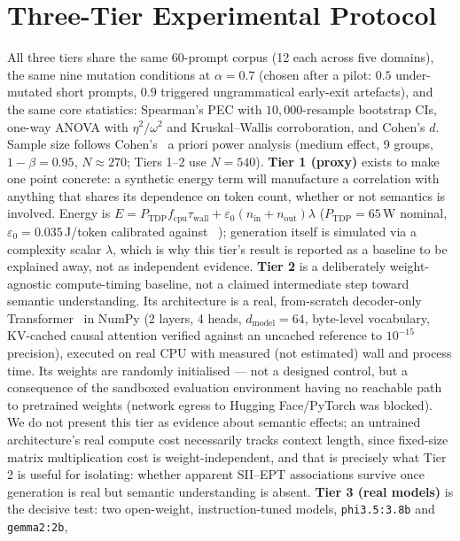 \documentclass[conference]{IEEEtran}
\begin{document}
\section{Three-Tier Experimental Protocol}
\label{sec:protocol}
All three tiers share the same 60-prompt corpus (12 each across five
domains), the same nine mutation conditions at $\alpha=0.7$ (chosen
after a pilot: $0.5$ under-mutated short prompts, $0.9$ triggered
ungrammatical early-exit artefacts), and the same core statistics:
Spearman's PEC with $10{,}000$-resample bootstrap CIs, one-way ANOVA
with $\eta^2/\omega^2$ and Kruskal--Wallis corroboration, and Cohen's
$d$. Sample size follows Cohen's~\cite{cohen1988statistical} a priori
power analysis (medium effect, 9 groups, $1-\beta=0.95$,
$N\approx270$; Tiers 1--2 use $N=540$).
\textbf{Tier 1 (proxy)} exists to make one point concrete: a synthetic
energy term will manufacture a correlation with anything that shares
its dependence on token count, whether or not semantics is involved.
Energy is $E=P_\text{TDP}f_\text{cpu}\tau_\text{wall}+
\varepsilon_0(n_\text{in}+n_\text{out})\lambda$ ($P_\text{TDP}=65$\,W
nominal, $\varepsilon_0=0.035$\,J/token calibrated against
~\cite{samsi2023words,faiz2024llmcarbon}); generation itself is
simulated via a complexity scalar $\lambda$, which is why this tier's
result is reported as a baseline to be explained away, not as
independent evidence.
\textbf{Tier 2} is a deliberately weight-agnostic compute-timing
baseline, not a claimed intermediate step toward semantic
understanding. Its architecture is a real, from-scratch decoder-only
Transformer~\cite{vaswani2017attention} in NumPy (2 layers, 4 heads, $d_\text{model}=64$,
byte-level vocabulary, KV-cached causal attention verified against an
uncached reference to $10^{-15}$ precision), executed on real CPU with
measured (not estimated) wall and process time. Its weights are
randomly initialised --- not a designed control, but a consequence of
the sandboxed evaluation environment having no reachable path to
pretrained weights (network egress to Hugging Face/PyTorch was
blocked). We do not present this tier as evidence about semantic
effects; an untrained architecture's real compute cost necessarily
tracks context length, since fixed-size matrix multiplication cost is
weight-independent, and that is precisely what Tier 2 is useful for
isolating: whether apparent SII--EPT associations survive once
generation is real but semantic understanding is absent.
\textbf{Tier 3 (real models)} is the decisive test: two open-weight,
instruction-tuned models, \texttt{phi3.5:3.8b} and \texttt{gemma2:2b},
\end{document}
